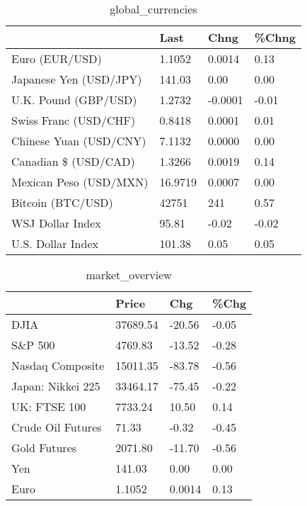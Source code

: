 \documentclass{article}%
\begin{document}
%


\begin{table}[htbp]%
\caption{global\_currencies}%
\centering%
\begin{adjustbox}{width=1\textwidth}%
\begin{tabular}{llll}
\toprule
                       &    Last &    Chng & \%Chng \\
\midrule
        Euro (EUR/USD) &  1.1052 &  0.0014 &  0.13 \\
Japanese Yen (USD/JPY) &  141.03 &    0.00 &  0.00 \\
  U.K. Pound (GBP/USD) &  1.2732 & -0.0001 & -0.01 \\
 Swiss Franc (USD/CHF) &  0.8418 &  0.0001 &  0.01 \\
Chinese Yuan (USD/CNY) &  7.1132 &  0.0000 &  0.00 \\
  Canadian \$ (USD/CAD) &  1.3266 &  0.0019 &  0.14 \\
Mexican Peso (USD/MXN) & 16.9719 &  0.0007 &  0.00 \\
     Bitcoin (BTC/USD) &   42751 &     241 &  0.57 \\
      WSJ Dollar Index &   95.81 &   -0.02 & -0.02 \\
     U.S. Dollar Index &  101.38 &    0.05 &  0.05 \\
\bottomrule
\end{tabular}
%
\end{adjustbox}%
\end{table}

%


\begin{table}[htbp]%
\caption{market\_overview}%
\centering%
\begin{adjustbox}{width=1\textwidth}%
\begin{tabular}{llll}
\toprule
                  &    Price &    Chg &  \%Chg \\
\midrule
             DJIA & 37689.54 & -20.56 & -0.05 \\
          S\&P 500 &  4769.83 & -13.52 & -0.28 \\
 Nasdaq Composite & 15011.35 & -83.78 & -0.56 \\
Japan: Nikkei 225 & 33464.17 & -75.45 & -0.22 \\
     UK: FTSE 100 &  7733.24 &  10.50 &  0.14 \\
Crude Oil Futures &    71.33 &  -0.32 & -0.45 \\
     Gold Futures &  2071.80 & -11.70 & -0.56 \\
              Yen &   141.03 &   0.00 &  0.00 \\
             Euro &   1.1052 & 0.0014 &  0.13 \\
\bottomrule
\end{tabular}
%
\end{adjustbox}%
\end{table}

%
\end{document}
